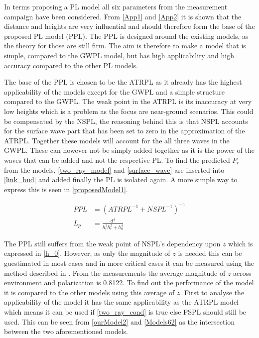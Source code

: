 

In terms proposing a PL model all six parameters from the measurement campaign have been considered. From \autoref{App1} and \autoref{App2} it is shown that the distance and heights are very influential and should therefore form the base of the proposed PL model (PPL). The PPL is designed around the existing models, as the theory for those are still firm. The aim is therefore to make a model that is simple, compared to the GWPL model, but has high applicability and high accuracy compared to the other PL models. 


The base of the PPL is chosen to be the ATRPL as it already has the highest applicability of the models except for the GWPL and a simple structure compared to the GWPL. The weak point in the ATRPL is its inaccuracy at very low heights which is a problem as the focus are near-ground scenarios. This could be compensated by the NSPL, the reasoning behind this is that NSPL accounts for the surface wave part that has been set to zero in the approximation of the ATRPL. Together these models will account for the all three waves in the GWPL. These can however not be simply added together as it is the power of the waves that can be added and not the respective PL. To find the predicted $P_r$ from the models, \eqref{two_ray_model} and \eqref{surface_wave} are inserted into \eqref{link_bud} and added finally the PL is isolated again. A more simple way to express this is seen in \eqref{proposedModel1}.


\begin{align}
PPL &= \left(ATRPL^{-1} + NSPL^{-1}\right)^{-1} \label{proposedModel1}\\
L_p &= \frac{d^4}{h_t^2 h_r^2+h_0^4} \label{proposedModel2}
\end{align}

The PPL still suffers from the weak point of NSPL's dependency upon $z$ which is expressed in \eqref{h_0}. However, as only the magnitude of $z$ is needed this can be guestimated in most cases and in more critical cases it can be measured using the method described in \cite{Kim}. From the measurements the average magnitude of $z$ across environment and polarization is 0.8122. To find out the performance of the model it is compared to the other models using this average of $z$. First to analyse the applicability of the model it has the same applicability as the ATRPL model which means it can be used if \eqref{two_ray_cond} is true else FSPL should still be used. This can be seen from \autoref{ourModel2} and \autoref{Models62} as the intersection between the two aforementioned models.


